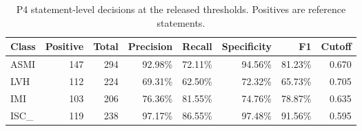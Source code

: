 \begin{table}[tbp]
\caption{P4 statement-level decisions at the released thresholds. Positives are reference statements.\label{tab:pathclass}}
\centering\small
\begin{tabular}{lrrrrrrr}
\toprule
Class & Positive & Total & Precision & Recall & Specificity & F1 & Cutoff \\
\midrule
ASMI & 147 & 294 & 92.98\% & 72.11\% & 94.56\% & 81.23\% & 0.670 \\
LVH & 112 & 224 & 69.31\% & 62.50\% & 72.32\% & 65.73\% & 0.705 \\
IMI & 103 & 206 & 76.36\% & 81.55\% & 74.76\% & 78.87\% & 0.635 \\
ISC\_ & 119 & 238 & 97.17\% & 86.55\% & 97.48\% & 91.56\% & 0.595 \\
\bottomrule
\end{tabular}
\end{table}